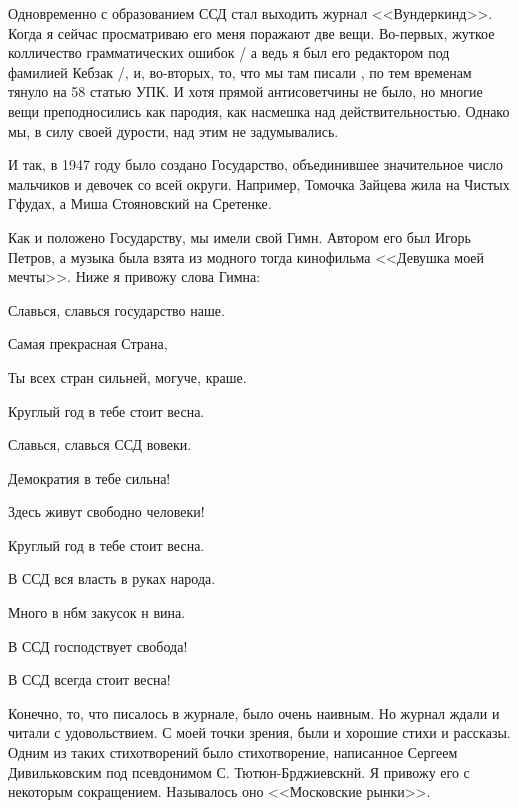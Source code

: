 Одновременно с образованием ССД стал выходить журнал <<Вундеркинд>>. Когда я сейчас просматриваю его меня поражают две вещи. Во-первых, жуткое колличество грамматических ошибок / а ведь я был его редактором под фамилией Кебзак /, и, во-вторых, то, что мы там писали , по тем временам тянуло на 58 статью УПК. И хотя прямой антисоветчины не было, но многие вещи преподносились как пародия, как насмешка над действительностью. Однако мы, в силу своей дурости, над этим не задумывались.

И так, в 1947 году было создано Государство, объединившее значительное число мальчиков и девочек со всей округи. Например, Томочка Зайцева жила на Чистых Гфудах, а Миша Стояновский на Сретенке.

Как и положено Государству, мы имели свой Гимн. Автором его был Игорь Петров, а музыка была взята из модного тогда кинофильма <<Девушка моей мечты>>. Ниже я привожу слова Гимна:

\indent

{\itshape

Славься, славься государство наше.

Самая прекрасная Страна,

Ты всех стран сильней, могуче, краше.

Круглый год в тебе стоит весна.

\indent

Славься, славься ССД вовеки.

Демократия в тебе сильна! 

Здесь живут свободно человеки! 

Круглый год в тебе стоит весна.

\indent

В ССД вся власть в руках народа.

Много в нбм закусок н вина.

В ССД господствует свобода!

В ССД всегда стоит весна!
}

\indent

Конечно, то, что писалось в журнале, было очень наивным. Но журнал ждали и читали с удовольствием. С моей точки зрения, были и хорошие стихи и рассказы. Одним из таких стихотворений было стихотворение, написанное Сергеем Дивильковским под псевдонимом С. Тютюн-Брджиевскнй. Я привожу его с некоторым сокращением. Называлось оно <<Московские рынки>>.

\indent

